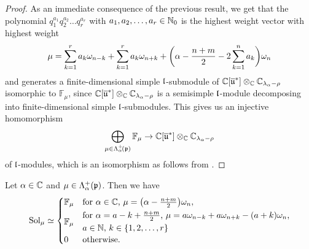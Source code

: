 \begin{proof}
As an immediate consequence of the previous result, we get that the polynomial $q_1^{a_1}q_2^{a_2}\dots q_r^{a_r}$ with $a_1,a_2,\dots,a_r \in \mathbb{N}_0$ is the highest weight vector with highest weight
\begin{align*}
\mu=\sum_{k=1}^r a_k \omega_{n-k} + \sum_{k=1}^r a_k \omega_{n+k} + \bigg(\alpha - {n+m \over 2} - 2\sum_{k=1}^n a_k\bigg) \omega_n
\end{align*}
and generates a finite-dimensional simple $\mathfrak{l}$-submodule of $\mathbb{C}[\overline{\mathfrak{u}}^*] \otimes_{\mathbb{C}} \mathbb{C}_{\lambda_\alpha-\rho}$ isomorphic to $\mathbb{F}_\mu$, since $\mathbb{C}[\overline{\mathfrak{u}}^*] \otimes_{\mathbb{C}} \mathbb{C}_{\lambda_\alpha-\rho}$ is a semisimple $\mathfrak{l}$-module decomposing into finite-dimensional simple $\mathfrak{l}$-submodules. This gives us an injective homomorphism
\begin{align*}
  \bigoplus_{\mu \in \Lambda^+_\alpha\!(\mathfrak{p})} \mathbb{F}_\mu \rightarrow \mathbb{C}[\overline{\mathfrak{u}}^*] \otimes_{\mathbb{C}} \mathbb{C}_{\lambda_\alpha-\rho}
\end{align*}
of $\mathfrak{l}$-modules, which is an isomorphism as follows from \cite{Goodman-Wallach2009}.
\end{proof}

\begin{lemma}\label{lem:solution space AGS}
Let $\alpha \in \mathbb{C}$ and $\mu \in \Lambda^+_\alpha(\mathfrak{p})$. Then we have
\begin{align*}
 \Sol_\mu \simeq
 \begin{cases}
   \mathbb{F}_\mu & \text{for $\alpha \in \C$, $\mu = \big(\alpha-{n+m \over 2}\big)\omega_n$}, \\[1mm]
   \mathbb{F}_\mu & \text{$\!\begin{gathered}\text{for $\alpha = a-k+{\textstyle {n+m \over 2}}$, $\mu=a \omega_{n-k} + a\omega_{n+k}-(a+k)\omega_n$,}\\[1mm] \text{$a \in \N$, $k \in \{1,2,\dots,r\}$} \hfill \end{gathered}$} \\[1mm]
   0 & \text{otherwise}.
 \end{cases}
\end{align*}
\end{lemma}

